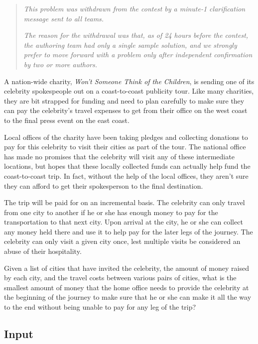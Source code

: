 
\begin{quotation}
{\it This problem was withdrawn from the contest by a minute-1
clarification message sent to all teams.}

{\it The reason for the withdrawal was that, as of 24 hours before the
contest, the authoring team had only a single sample solution, and we
strongly prefer to move forward with a problem only after independent
confirmation by two or more authors.}
\end{quotation}

A nation-wide charity, {\em Won't Someone Think of the Children}, is
sending one of its celebrity spokespeople out on a coast-to-coast
publicity tour. Like many charities, they are bit strapped for funding
and need to plan carefully to make sure they can pay the celebrity's
travel expenses to get from their office on the west coast to the
final press event on the east coast.

Local offices of the charity have been taking pledges and collecting
donations to pay for this celebrity to visit their cities as part of
the tour. The national office has made no promises that the celebrity
will visit any of these intermediate locations, but hopes that these
locally collected funds can actually help fund the coast-to-coast
trip. In fact, without the help of the local offices, they aren't sure
they can afford to get their spokesperson to the final destination.

The trip will be paid for on an incremental basis. The celebrity can
only travel from one city to another if he or she has enough money to
pay for the transportation to that next city. Upon arrival at the
city, he or she can collect any money held there and use it to help
pay for the later legs of the journey. The celebrity can only visit a
given city once, lest multiple visits be considered an abuse of
their hospitality.

Given a list of cities that have invited the celebrity, the amount of
money raised by each city, and the travel costs between various pairs
of cities, what is the smallest amount of money that the home office
needs to provide the celebrity at the beginning of the journey to make
sure that he or she can make it all the way to the end without being
unable to pay for any leg of the trip?

\subsection*{Input}

